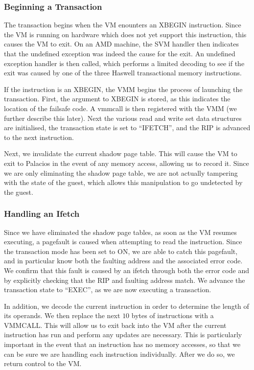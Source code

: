 \documentclass{acm_proc_article-sp}
\begin{document}
\subsubsection{Beginning a Transaction}

The transaction begins when the VM enounters an XBEGIN instruction. Since the 
VM is running on hardware which does not yet support this instruction, this
causes the VM to exit. On an AMD machine, the SVM handler then indicates that
the undefined exception was indeed the cause for the exit. An undefined 
exception handler is then called, which performs a limited decoding to see
if the exit was caused by one of the three Haswell transactional memory
instructions.    

If the instruction is an XBEGIN, the VMM begins the process of launching the
transaction. First, the argument to XBEGIN is stored, as this indicates the 
location of the failsafe code. A vmmcall is then registered with the VMM
(we further describe this later). Next the various read and write set data
structures are initialised, the transaction state is set to ``IFETCH'', and the
RIP is advanced to the next instruction.

Next, we invalidate the current shadow page table. This will cause the VM to 
exit to Palacios in the event of any memory access, allowing us to record it.
Since we are only eliminating the shadow page table, we are not actually
tampering with the state of the guest, which allows this manipulation to go
undetected by the guest.

\subsubsection{Handling an Ifetch}

Since we have eliminated the shadow page tables, as soon as the VM resumes
executing, a pagefault is caused when attempting to read the instruction.
Since the transaction mode has been set to ON, we are able to catch this
pagefault, and in particular know both the faulting address and the associated
error code. We confirm that this fault is caused by an ifetch through both
the error code and by explicitly checking that the RIP and faulting address
match. We advance the transaction state to ``EXEC'', as we are now executing
a transaction. 
  
In addition, we decode the current instruction in order to determine the length
of its operands. We then replace the next $10$ bytes of instructions with
a VMMCALL. This will allow us to exit back into the VM after the current
instruction has run and perform any updates are necessary. This is particularly
important in the event that an instruction has no memory accesses, so that we
can be sure we are handling each instruction individually. After we do so, 
we return control to the VM.
\end{document}
